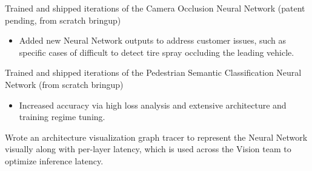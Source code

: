 \begin{cventries}
{\begin{cvitems}
\begin{itemize}
			\end{itemize}
			\item Trained and shipped iterations of the Camera Occlusion Neural Network (patent pending, from scratch bringup)
			\begin{itemize}
				\item Added new Neural Network outputs to address customer issues, such as specific cases of difficult to detect tire spray occluding the leading vehicle.
			\end{itemize}
			\item Trained and shipped iterations of the Pedestrian Semantic Classification Neural Network (from scratch bringup)
			\begin{itemize}
				\item Increased accuracy via high loss analysis and extensive architecture and training regime tuning.
			\end{itemize}
			\item Wrote an architecture visualization graph tracer to represent the Neural Network visually along with per-layer latency, which is used across the Vision team to optimize inference latency.
		\end{cvitems}
	}


\end{cventries}
